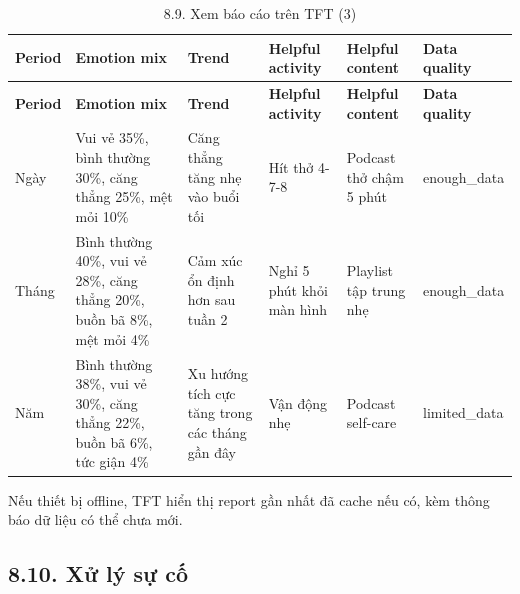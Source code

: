 \documentclass[12pt,a4paper]{article}
\begin{document}
\begin{center}
\scriptsize
\begin{longtable}{|P{0.15\textwidth}|P{0.15\textwidth}|P{0.15\textwidth}|P{0.15\textwidth}|P{0.15\textwidth}|P{0.15\textwidth}|}
\caption{8.9. Xem báo cáo trên TFT (3)}\\
\hline
\textbf{Period} & \textbf{Emotion mix} & \textbf{Trend} & \textbf{Helpful activity} & \textbf{Helpful content} & \textbf{Data quality} \\
\hline
\endfirsthead
\hline
\textbf{Period} & \textbf{Emotion mix} & \textbf{Trend} & \textbf{Helpful activity} & \textbf{Helpful content} & \textbf{Data quality} \\
\hline
\endhead
Ngày & Vui vẻ 35\%, bình thường 30\%, căng thẳng 25\%, mệt mỏi 10\% & Căng thẳng tăng nhẹ vào buổi tối & Hít thở 4-7-8 & Podcast thở chậm 5 phút & enough\_data \\
\hline
Tháng & Bình thường 40\%, vui vẻ 28\%, căng thẳng 20\%, buồn bã 8\%, mệt mỏi 4\% & Cảm xúc ổn định hơn sau tuần 2 & Nghỉ 5 phút khỏi màn hình & Playlist tập trung nhẹ & enough\_data \\
\hline
Năm & Bình thường 38\%, vui vẻ 30\%, căng thẳng 22\%, buồn bã 6\%, tức giận 4\% & Xu hướng tích cực tăng trong các tháng gần đây & Vận động nhẹ & Podcast self-care & limited\_data \\
\hline
\end{longtable}
\normalsize
\end{center}

Nếu thiết bị offline, TFT hiển thị report gần nhất đã cache nếu có, kèm thông báo dữ liệu có thể chưa mới.


\subsection*{8.10. Xử lý sự cố}
\end{document}
